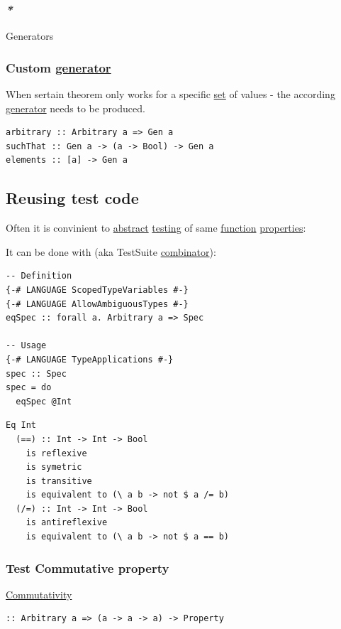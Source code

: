 \documentclass[a4paper,14pt,oneside]{book}
\begin{document}
\subsubsection{\emph{*}}
\label{sec:org9f082eb}

\label{orga1fc9e9}Generators

\subsubsection{Custom \hyperref[orgc680a74]{generator}}
\label{sec:org328d8f0}
When sertain theorem only works for a specific \hyperref[orgb802935]{set} of values - the according \hyperref[orgc680a74]{generator} needs to be produced.

\begin{verbatim}
arbitrary :: Arbitrary a => Gen a
suchThat :: Gen a -> (a -> Bool) -> Gen a
elements :: [a] -> Gen a
\end{verbatim}

\subsection{\label{orge50a70e}Reusing test code}
\label{sec:org6d06858}
Often it is convinient to \hyperref[orge5ac618]{abstract} \hyperref[orgb8cb0ed]{testing} of same \hyperref[org27c946d]{function} \hyperref[org2e72dee]{properties}:

It can be done with (aka TestSuite \hyperref[org84ae83b]{combinator}):
\begin{verbatim}
-- Definition
{-# LANGUAGE ScopedTypeVariables #-}
{-# LANGUAGE AllowAmbiguousTypes #-}
eqSpec :: forall a. Arbitrary a => Spec

-- Usage
{-# LANGUAGE TypeApplications #-}
spec :: Spec
spec = do
  eqSpec @Int
\end{verbatim}

\begin{verbatim}
Eq Int
  (==) :: Int -> Int -> Bool
    is reflexive
    is symetric
    is transitive
    is equivalent to (\ a b -> not $ a /= b)
  (/=) :: Int -> Int -> Bool
    is antireflexive
    is equivalent to (\ a b -> not $ a == b)
\end{verbatim}

\subsubsection{\label{org1fc2a5a}Test Commutative property}
\label{sec:orgb2afcec}
\hyperref[orgd89966c]{Commutativity}
\begin{verbatim}
:: Arbitrary a => (a -> a -> a) -> Property
\end{verbatim}
\end{document}
